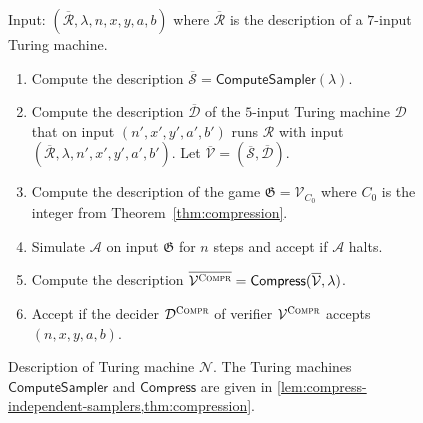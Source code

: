 \documentclass[11pt]{article}
\theoremstyle{definition}
\newcommand{\desc}[1]{\overline{\cal{#1}}}
\newcommand{\game}{\mathfrak{G}}
\newcommand{\sampler}{\mathcal{S}}
\newcommand{\decider}{\mathcal{D}}
\newcommand{\verifier}{\mathcal{V}}
\newcommand{\compr}{\textsc{Compr}}
\renewcommand{\cal}[1]{\mathcal{#1}}
\newcommand{\tmstyle}[1]{\ensuremath{\mathsf{#1}}}
\newcommand{\Compress}{\tmstyle{Compress}}
\newcommand{\ComputeSampler}{\tmstyle{ComputeSampler}}
\newenvironment{gamespec}{
  \begin{mdframed}[style=figstyle]}{
  \end{mdframed}}
\begin{document}
\begin{figure}[!htb]
  \centering
  \begin{gamespec}
    Input: $(\desc{R}, \lambda, n, x, y, a, b)$ where $\desc{R}$ is
    the description of a $7$-input Turing machine.
    \begin{enumerate}
    \item Compute the description $\overline{\sampler} = \ComputeSampler(\lambda)$.
    \item Compute the description $\overline{\decider}$ of the $5$-input Turing
      machine $\decider$ that on input $(n', x', y', a', b')$ runs $\cal{R}$ with
      input $(\desc{R}, \lambda, n', x', y', a', b')$.
      Let $\overline{\verifier} = (\overline{\sampler}, \overline{\decider})$.
    \item Compute the description of the game $\game = \verifier_{C_0}$ where
      $C_0$ is the integer from Theorem~\ref{thm:compression}.
    \item Simulate $\cal{A}$ on input $\game$ for $n$ steps and accept if
      $\cal{A}$ halts.
    \item Compute the description $\overline{\verifier^\compr} =
      \Compress(\overline{\verifier}, \lambda)$.
    \item Accept if the decider $\decider^\compr$ of verifier
      $\verifier^\compr$ accepts $(n, x, y, a, b)$.
    \end{enumerate}
  \end{gamespec}
  \caption{Description of Turing machine $\cal{N}$.
    The Turing machines $\ComputeSampler$ and $\Compress$ are given in
    \cref{lem:compress-independent-samplers,thm:compression}.}
  \label{fig:separation}
\end{figure}
\end{document}
